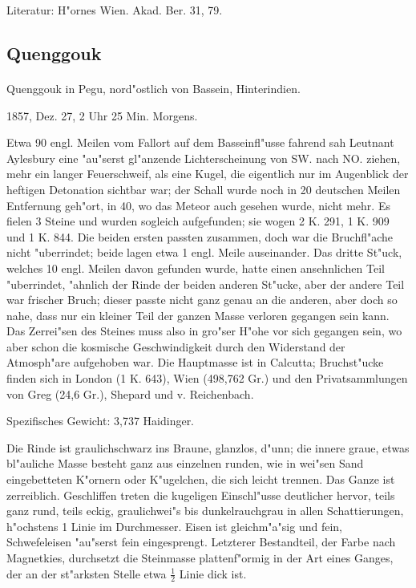 \documentclass[a4paper, 11pt, oneside]{article}
\begin{document}
\footnotesize
Literatur: H"ornes Wien. Akad. Ber. 31, 79.

\subsection{Quenggouk}
\normalsize
\paragraph{}
Quenggouk in Pegu, nord"ostlich von Bassein, Hinterindien.

1857, Dez. 27, 2 Uhr 25 Min. Morgens.

Etwa 90 engl. Meilen vom Fallort auf dem Basseinfl"usse fahrend sah Leutnant Aylesbury eine "au"serst gl"anzende Lichterscheinung von SW. nach NO. ziehen, mehr ein langer Feuerschweif, als eine Kugel, die eigentlich nur im Augenblick der heftigen Detonation sichtbar war; der Schall wurde noch in 20 deutschen Meilen Entfernung geh"ort, in 40, wo das Meteor auch gesehen wurde, nicht mehr. Es fielen 3 Steine und wurden sogleich aufgefunden; sie wogen 2 K. 291, 1 K. 909 und 1 K. 844. Die beiden ersten passten zusammen, doch war die Bruchfl"ache nicht "uberrindet; beide lagen etwa 1 engl. Meile auseinander. Das dritte St"uck, welches 10 engl. Meilen davon gefunden wurde, hatte einen ansehnlichen Teil "uberrindet, "ahnlich der Rinde der beiden anderen St"ucke, aber der andere Teil war frischer Bruch; dieser passte nicht ganz genau an die anderen, aber doch so nahe, dass nur ein kleiner Teil der ganzen Masse verloren gegangen sein kann. Das Zerrei"sen des Steines muss also in gro"ser H"ohe vor sich gegangen sein, wo aber schon die kosmische Geschwindigkeit durch den Widerstand der Atmosph"are aufgehoben war. Die Hauptmasse ist in Calcutta; Bruchst"ucke finden sich in London (1 K. 643), Wien (498,762 Gr.) und den Privatsammlungen von Greg (24,6 Gr.), Shepard und v. Reichenbach.

Spezifisches Gewicht: 3,737 Haidinger.

Die Rinde ist graulichschwarz ins Braune, glanzlos, d"unn; die innere graue, etwas bl"auliche Masse besteht ganz aus einzelnen runden, wie in wei"sen Sand eingebetteten K"ornern oder K"ugelchen, die sich leicht trennen. Das Ganze ist zerreiblich. Geschliffen treten die kugeligen Einschl"usse deutlicher hervor, teils ganz rund, teils eckig, graulichwei"s bis dunkelrauchgrau in allen Schattierungen, h"ochstens 1 Linie im Durchmesser. Eisen ist gleichm"a"sig und fein, Schwefeleisen "au"serst fein eingesprengt. Letzterer Bestandteil, der Farbe nach Magnetkies, durchsetzt die Steinmasse plattenf"ormig in der Art eines Ganges, der an der st"arksten Stelle etwa $\frac{1}{2}$ Linie dick ist.
\end{document}
